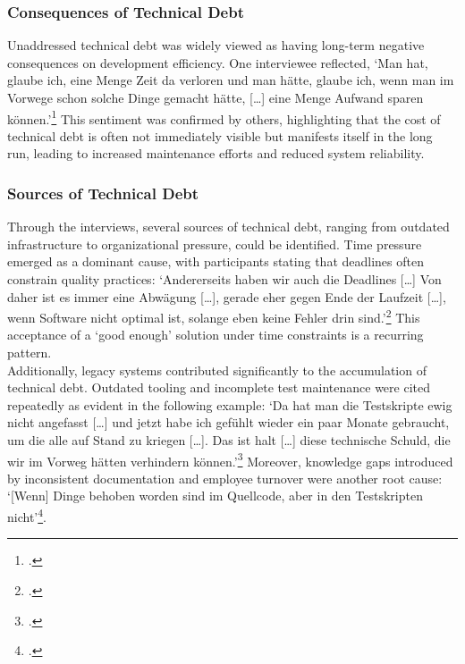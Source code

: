 \subsubsection{Consequences of Technical Debt}
Unaddressed technical debt was widely viewed as having long-term negative consequences on development efficiency. One interviewee reflected, `Man hat, glaube ich, eine Menge Zeit da verloren und man hätte, glaube ich, wenn man im Vorwege schon solche Dinge gemacht hätte, [\ldots] eine Menge Aufwand sparen können.'\footcite{Interview12025}
This sentiment was confirmed by others, highlighting that the cost of technical debt is often not immediately visible but manifests itself in the long run, leading to increased maintenance efforts and reduced system reliability.\\

\subsubsection{Sources of Technical Debt}
Through the interviews, several sources of technical debt, ranging from outdated infrastructure to organizational pressure, could be identified. Time pressure emerged as a dominant cause, with participants stating that deadlines often constrain quality practices: `Andererseits haben wir auch die Deadlines [\ldots] Von daher ist es immer eine Abwägung
[\ldots], gerade eher gegen Ende der Laufzeit [\ldots], wenn Software nicht optimal ist, solange eben keine Fehler drin sind.'\footcite{Interview22025} This acceptance of a `good enough' solution under time constraints is a recurring pattern.\\

Additionally, legacy systems contributed significantly to the accumulation of technical debt. Outdated tooling and incomplete test maintenance were cited repeatedly as evident in the following example: `Da hat man die Testskripte ewig nicht angefasst [\ldots] und jetzt habe ich gefühlt wieder ein paar Monate gebraucht, um die alle auf Stand zu kriegen [\ldots].
Das ist halt [\ldots] diese technische Schuld, die wir im Vorweg hätten verhindern können.'\footcite{Interview12025} Moreover, knowledge gaps introduced by inconsistent documentation and employee turnover were another root cause: `[Wenn] Dinge behoben worden sind im Quellcode, aber in den Testskripten nicht'\footcite{Interview12025}.

